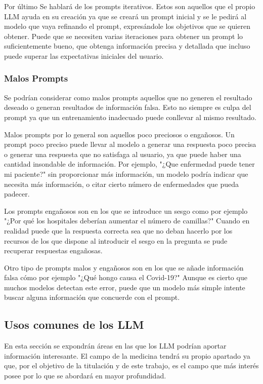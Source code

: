 Por último Se hablará de los prompts iterativos. Estos son aquellos que el propio LLM ayuda en su creación ya que se creará un prompt inicial y se le pedirá al modelo que vaya refinando el prompt, expresándole los objetivos que se quieren obtener. Puede que se necesiten varias iteraciones para obtener un prompt lo suficientemente bueno, que obtenga información precisa y detallada que incluso puede superar las expectativas iniciales del usuario.

\subsubsection{Malos Prompts}

Se podrían considerar como malos prompts aquellos que no generen el resultado deseado o generan resultados de información falsa. Esto no siempre es culpa del prompt ya que un entrenamiento inadecuado puede conllevar al mismo resultado.

Malos prompts por lo general son aquellos poco preciosos o engañosos. Un prompt poco preciso puede llevar al modelo a generar una respuesta poco precisa o generar una respuesta que no satisfaga al usuario, ya que puede haber una cantidad insondable de información. Por ejemplo, "¿Que enfermedad puede tener mi paciente?" sin proporcionar más información, un modelo podría indicar que necesita más información, o citar cierto número de enfermedades que pueda padecer.

Los prompts engañosos son en los que se introduce un sesgo como por ejemplo "¿Por qué los hospitales deberían aumentar el número de camillas?" Cuando en realidad puede que la respuesta correcta sea que no deban hacerlo por los recursos de los que dispone al introducir el sesgo en la pregunta se pude recuperar respuestas engañosas. 

Otro tipo de prompts malos y engañosos son en los que se añade información falsa cómo por ejemplo "¿Qué hongo causa el Covid-19?" Aunque es cierto que muchos modelos detectan este error, puede que un modelo más simple intente buscar alguna información que concuerde con el prompt.

\cite{heston_prompt_2023}

\subsection{Usos comunes de los LLM}

En esta sección se expondrán áreas en las que los LLM podrían aportar información interesante. El campo de la medicina tendrá su propio apartado ya que, por el objetivo de la titulación y de este trabajo, es el campo que más interés posee por lo que se abordará en mayor profundidad.
